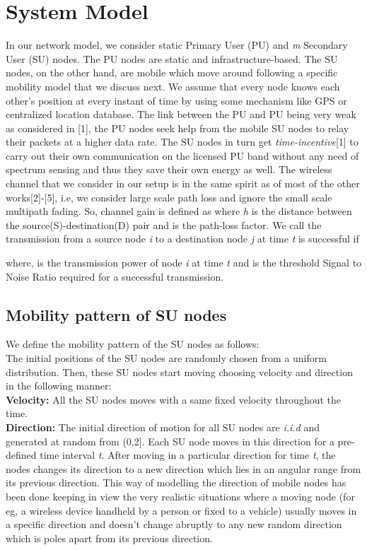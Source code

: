 \documentclass[conference]{IEEEtran}
\begin{document}
\section{System Model}

In our network model, we consider  static Primary User (PU) and \emph{m} Secondary User (SU) nodes. The PU nodes are static and infrastructure-based.
The SU nodes, on the other hand, are mobile which move around following a specific mobility model that we discuss next. We assume that every node knows each other's position 
at every instant of time by using some mechanism like GPS or centralized location database. The link between the PU  and PU  
being very weak as considered in [1], the PU nodes seek help from the mobile SU nodes to relay their packets at a higher data rate. The SU nodes in turn 
get \emph{time-incentive}[1] to carry out their own communication on the licensed PU band without any need of spectrum sensing and thus they save their own energy as well. 
The wireless channel that we consider in our setup is in the same spirit as of most of the other works[2]-[5], i.e, we consider large scale path loss and ignore the small scale 
multipath fading. So, channel gain is defined as 
where \emph{h} is the distance between the source(S)-destination(D) pair and  is the path-loss factor. We call the transmission from a source 
node \emph{i} to a destination node \emph{j} at time \emph{t} is successful if  

where,  is the transmission power of node \emph{i} at time \emph{t} and  is the threshold Signal to Noise Ratio required for a successful transmission. 

\subsection{Mobility pattern of SU nodes}

We define the mobility pattern of the SU nodes as follows:\\
The initial positions of the SU nodes are randomly chosen from a uniform distribution. Then, these SU nodes start moving choosing velocity and direction in the 
following manner:\\
{\bf Velocity:} All the SU nodes moves with a same fixed velocity  throughout the time.\\
{\bf Direction:} The initial direction of motion for all SU nodes are \emph{i.i.d} and generated at random from (0,2]. Each SU node moves in this 
direction for a pre-defined time interval \emph{t}. After moving in a particular direction for time \emph{t}, the nodes changes its direction to a new direction
 which lies in an angular range  from its previous direction. This way of modelling the direction of mobile nodes has been done keeping in view the very 
realistic situations where a moving node (for eg, a wireless device handheld by a person or fixed to a vehicle) usually moves in a specific direction and doesn't 
change abruptly to any new random direction which is poles apart from its previous direction.
\end{document}
